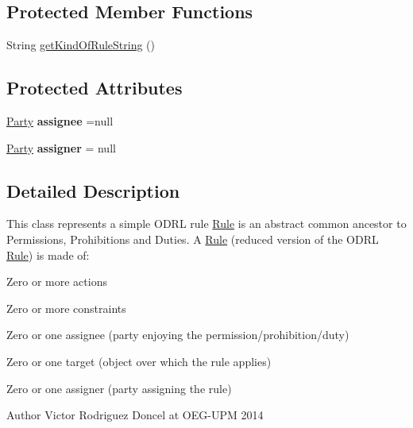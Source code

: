 \subsection*{Protected Member Functions}
\begin{DoxyCompactItemize}
\item 
String \hyperlink{classodrlmodel_1_1_rule_ab794be33eac213d7ebc7124baaf479c3}{get\-Kind\-Of\-Rule\-String} ()
\end{DoxyCompactItemize}
\subsection*{Protected Attributes}
\begin{DoxyCompactItemize}
\item 
\hypertarget{classodrlmodel_1_1_rule_a22aba6ee5f6981c1c487cf5d638c8941}{\hyperlink{classodrlmodel_1_1_party}{Party} {\bfseries assignee} =null}\label{classodrlmodel_1_1_rule_a22aba6ee5f6981c1c487cf5d638c8941}

\item 
\hypertarget{classodrlmodel_1_1_rule_a5494d7ff153d6047be45c9950ac8877b}{\hyperlink{classodrlmodel_1_1_party}{Party} {\bfseries assigner} = null}\label{classodrlmodel_1_1_rule_a5494d7ff153d6047be45c9950ac8877b}

\end{DoxyCompactItemize}


\subsection{Detailed Description}
This class represents a simple O\-D\-R\-L rule \hyperlink{classodrlmodel_1_1_rule}{Rule} is an abstract common ancestor to Permissions, Prohibitions and Duties. A \hyperlink{classodrlmodel_1_1_rule}{Rule} (reduced version of the O\-D\-R\-L \hyperlink{classodrlmodel_1_1_rule}{Rule}) is made of\-:
\begin{DoxyItemize}
\item Zero or more actions
\item Zero or more constraints
\item Zero or one assignee (party enjoying the permission/prohibition/duty)
\item Zero or one target (object over which the rule applies)
\item Zero or one assigner (party assigning the rule) \begin{DoxyAuthor}{Author}
Victor Rodriguez Doncel at O\-E\-G-\/\-U\-P\-M 2014 
\end{DoxyAuthor}

\end{DoxyItemize}

